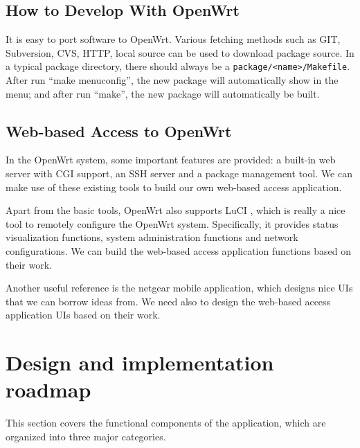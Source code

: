 \documentclass{sig-alternate-05-2015}
\begin{document}
	\subsection{How to Develop With OpenWrt}
	
	It is easy to port software to OpenWrt. Various fetching methods such as GIT, Subversion, CVS, HTTP, local source can be used to download package source. In a typical package directory, there should always be a \verb|package/<name>/Makefile|. After run ``make menuconfig'', the new package will automatically show in the menu; and after run ``make'', the new package will automatically be built.
	
	\subsection{Web-based Access to OpenWrt}
	In the OpenWrt system, some important features are provided: a built-in web server with CGI support, an SSH server and a package management tool. We can make use of these existing tools to build our own web-based access application.
	
	Apart from the basic tools, OpenWrt also supports LuCI \cite{LuCI}, which is really a nice tool to remotely configure the OpenWrt system. Specifically, it provides status visualization functions, system administration functions and network configurations. We can build the web-based access application functions based on their work.
	
	Another useful reference is the netgear \cite{netgear} mobile application, which designs nice UIs that we can borrow ideas from. We need also to design the web-based access application UIs based on their work.
	
	\section{Design and implementation \\ roadmap}
	
	This section covers the functional components of the application, which are organized into three major categories.
	
\end{document}
